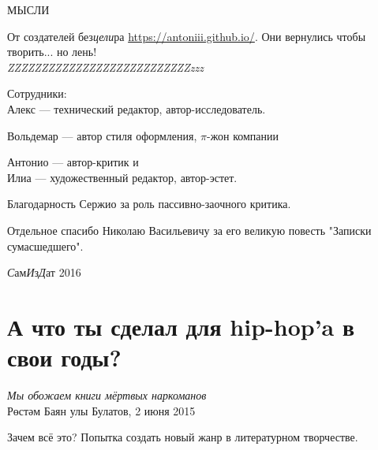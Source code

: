 \documentclass{ideas}
\author{Alive Pine, Inc.}
\begin{document}
\begin{titlepage}

\vspace*{\fill}
\begin{center}
\Huge МЫСЛИ
\end{center}
\vspace*{\fill}
\end{titlepage}

\begin{titlepage}
    От создателей без\emph{цели}ра \href{100 идей для стартапа}{https://antoniii.github.io/}. 
    Они вернулись чтобы творить... но лень!\\

    \emph{\Huge{ZZZ}\LARGE{ZZZ}\Large{ZZZ}\large{ZZZ}ZZZ\small{ZZZ}\footnotesize{ZZZ}\scriptsize{ZZZ}\tiny{ZZZ}\tiny{zzz}}
\end{titlepage}

\begin{center}
\end{center}
\newpage

\begin{center}
Сотрудники:\\
Алекс --- технический редактор, автор-исследователь.\\\vspace{1em}

Вольдемар --- автор стиля оформления, \( \pi\text{-жон} \) компании\\\vspace{1em}

Антонио --- автор-критик и \\Илиа --- художественный редактор, автор-эстет.\\
\end{center}


Благодарность Сержио за роль пассивно-заочного критика. 


Отдельное спасибо Николаю Васильевичу за его великую повесть "Записки сумасшедшего".
\vfill
\begin{center}
\textit{С}ам\textit{И}з\textit{Д}ат 2016
\end{center}
\newpage
\section*{А что ты сделал для hip-hop'a в свои годы?}\label{section:one}
\begin{displayquote}
\begin{flushright}
    \textit{Мы обожаем книги мёртвых наркоманов}\\
    Рөстәм Баян улы Булатов, 2 июня 2015
\end{flushright}
\end{displayquote}
Зачем всё это? Попытка создать новый жанр в литературном творчестве.
\end{document}

